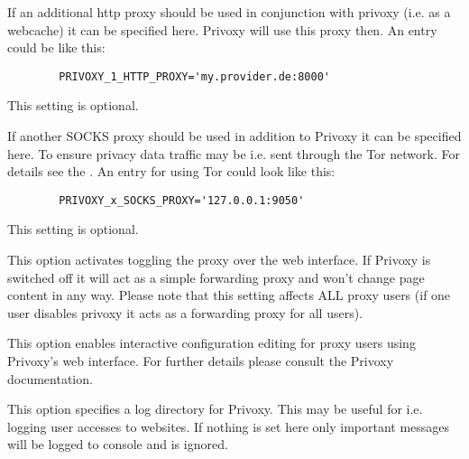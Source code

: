 \begin{description}

        {If an additional http proxy should be used in conjunction with privoxy
        (i.e. as a webcache) it can be specified here. Privoxy will use this
        proxy then. An entry could be like this:

\begin{example}
\begin{verbatim}
        PRIVOXY_1_HTTP_PROXY='my.provider.de:8000'
\end{verbatim}
\end{example}
        This setting is optional.}


        {If another SOCKS proxy should be used in addition to Privoxy
        it can be specified here. To ensure privacy data traffic may be
        i.e. sent through the Tor network. For details see the
        .
        An entry for using Tor could look like this:

\begin{example}
\begin{verbatim}
        PRIVOXY_x_SOCKS_PROXY='127.0.0.1:9050'
\end{verbatim}
\end{example}
        This setting is optional.}


        {This option activates toggling the proxy over the web interface.
        If Privoxy is switched off it will act as a simple forwarding
        proxy and won't change page content in any way. Please note
        that this setting affects ALL proxy users (if one user disables
        privoxy it acts as a forwarding proxy for all users).}


        {This option enables interactive configuration editing for proxy
        users using Privoxy's web interface. For further details please
        consult the Privoxy documentation.}


        {This option specifies a log directory for Privoxy. This may be
        useful for i.e. logging user accesses to websites. If nothing is
        set here only important messages will be logged to console and
         is ignored.}


\end{description}
